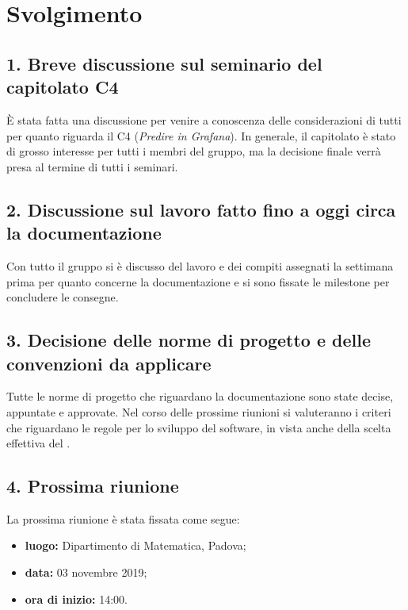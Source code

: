 \newpage
\section*{Svolgimento}

\subsection*{1. Breve discussione sul seminario del capitolato C4 }

È stata fatta una discussione per venire a conoscenza delle considerazioni di tutti per quanto riguarda il  C4 (\textit{Predire in Grafana}). In generale, il capitolato è stato di grosso interesse per tutti i membri del gruppo, ma la decisione finale verrà presa al termine di tutti i seminari.

\subsection*{2. Discussione sul lavoro fatto fino a oggi circa la documentazione}

Con tutto il gruppo si è discusso del lavoro e dei compiti assegnati la settimana prima per quanto concerne la documentazione e si sono fissate le milestone per concludere le consegne.

\subsection*{3. Decisione delle norme di progetto e delle convenzioni da applicare}

Tutte le norme di progetto che riguardano la documentazione sono state decise, appuntate e approvate. Nel corso delle prossime riunioni si valuteranno i criteri che riguardano le regole per lo sviluppo del software, in vista anche della scelta effettiva del .

\subsection*{4. Prossima riunione}

La prossima riunione è stata fissata come segue:
\begin{itemize}
	\item \textbf{luogo:} Dipartimento di Matematica, Padova;
	\item \textbf{data:} 03 novembre 2019;
	\item \textbf{ora di inizio:} 14:00.
\end{itemize}
